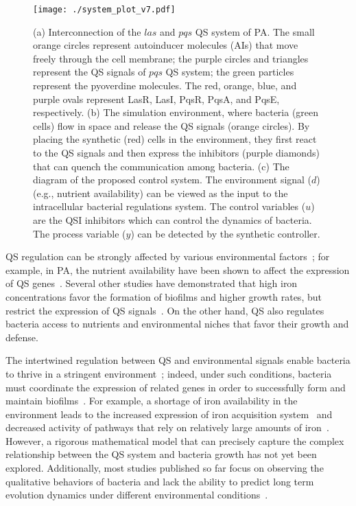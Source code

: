 \documentclass[runningheads]{llncs}
\begin{document}
\begin{figure}[!t]
\centering
\texttt{[image: ./system\_plot\_v7.pdf]}
\caption{(a) Interconnection of the $las$ and $pqs$ QS system of PA. The small orange circles represent autoinducer molecules (AIs) that move freely through the cell membrane; the purple circles and triangles represent the QS signals of $pqs$ QS system; the green particles represent the pyoverdine molecules. The red, orange, blue, and purple ovals represent LasR, LasI, PqsR, PqsA, and PqsE, respectively. (b) The simulation environment, where bacteria (green cells) flow in space and release the QS signals (orange circles). By placing the synthetic (red) cells in the environment, they first react to the QS signals and then express the inhibitors (purple diamonds) that can quench the communication among bacteria. (c) The diagram of the proposed control system. The environment signal ($d$) (e.g., nutrient availability) can be viewed as the input to the intracellular bacterial regulations system. The control variables ($u$) are the QSI inhibitors which can control the dynamics of bacteria. The process variable ($y$) can be detected by the synthetic controller.  }
\label{fig:system_plot}
\end{figure}



QS regulation can be strongly affected by various environmental factors~\cite{Hazan2010}; for example, in PA, the nutrient availability have been shown to affect the expression of QS genes~\cite{Withers2001}. Several other studies have demonstrated that high iron concentrations favor the formation of biofilms and higher growth rates, but restrict the expression of QS signals~\cite{Whiteley1999}\cite{Kim2005}. On the other hand, QS also regulates bacteria access to nutrients and environmental niches that favor their growth and defense.  

The intertwined regulation between QS and environmental signals enable bacteria to thrive in a stringent environment~\cite{Balasubramanian2013}\cite{Oglesby2008}; indeed, under such conditions, bacteria must coordinate the expression of related genes in order to successfully form and maintain biofilms~\cite{Oglesby-Sherrouse2014}. For example, a shortage of iron availability in the environment leads to the increased expression of iron acquisition system~\cite{Bredenbruch2006}\cite{Banin2005} 
 and decreased activity of pathways that rely on relatively large amounts of iron~\cite{Haussler2008}. However, a rigorous mathematical model that can precisely capture the complex relationship between the QS system and bacteria growth has not yet been explored. Additionally, most studies published so far focus on observing the qualitative behaviors of bacteria and lack the ability to predict long term evolution dynamics under different environmental conditions~\cite{Schaadt2013}. 
\end{document}
